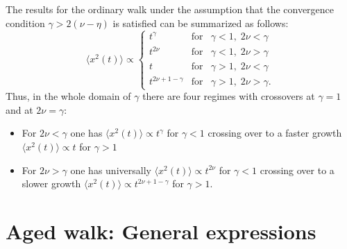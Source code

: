 The results for the ordinary walk under the assumption that the convergence condition $\gamma > 2(\nu-\eta)$ is satisfied can be summarized as follows: 
\begin{equation}
\langle x^2(t) \rangle \propto \left\{
  \begin{array}{lll}
  t^{\gamma} & \mathrm{for} & \gamma < 1, \; 2\nu < \gamma \\
t^{2\nu} & \mathrm{for} & \gamma < 1, \; 2\nu > \gamma \\
t & \mathrm{for} & \gamma > 1, \; 2\nu < \gamma \\
t^{2\nu+1- \gamma  } &\mathrm{for} &  \gamma > 1, \;2\nu > \gamma .
  \end{array}
  \right.
\label{balpoint}
\end{equation}
Thus, in the whole domain of $\gamma$ there are four regimes with crossovers at $\gamma = 1$ and at $2\nu = \gamma$:
\begin{itemize}
 \item For $2\nu < \gamma$ one has $\langle x^2(t) \rangle \propto t^{\gamma}$ for $\gamma <1$ crossing over to a faster growth $\langle x^2(t) \rangle \propto t$ for $\gamma > 1$
 \item For $2\nu > \gamma$ one has universally $\langle x^2(t) \rangle \propto t^{2\nu}$ for $\gamma <1$ crossing over to a slower growth $\langle x^2(t) \rangle \propto t^{2\nu+1-\gamma}$ for $\gamma > 1$.
\end{itemize}


\section{Aged walk: General expressions \label{Sec:Aged}}

